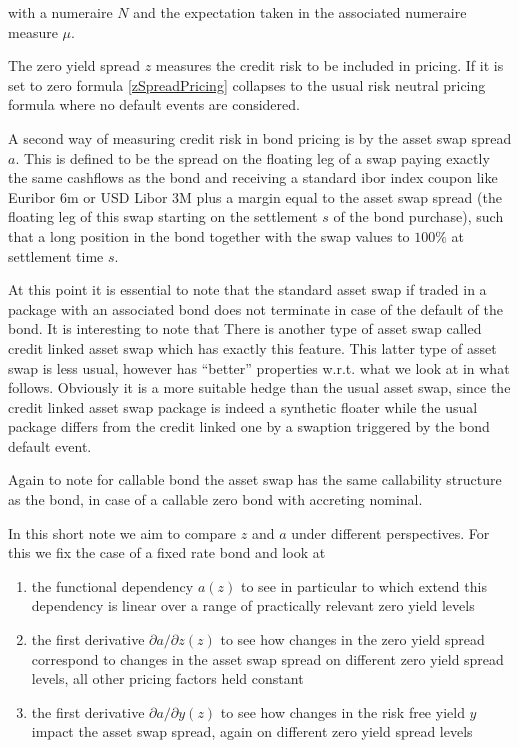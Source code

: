 \documentclass{amsart}
\theoremstyle{plain}
\numberwithin{equation}{section}
\begin{document}
with a numeraire $N$ and the expectation taken in the associated numeraire measure $\mu$. 

The zero yield spread $z$ measures the credit risk to be included in pricing. If it is set to zero formula \ref{zSpreadPricing} collapses to the usual risk neutral pricing formula where no default events are considered.

A second way of measuring credit risk in bond pricing is by the asset swap spread $a$. This is defined to be the spread on the floating leg of a swap paying exactly the same cashflows as the bond and receiving a standard ibor index coupon like Euribor 6m or USD Libor 3M plus a margin equal to the asset swap spread (the floating leg of this swap starting on the settlement $s$ of the bond purchase), such that a long position in the bond together with the swap values to $100\%$ at settlement time $s$.

At this point it is essential to note that the standard asset swap if traded in a package with an associated bond does not terminate in case of the default of the bond. It is interesting to note that There is another type of asset swap called credit linked asset swap which has exactly this feature. This latter type of asset swap is less usual, however has ``better'' properties w.r.t. what we look at in what follows. Obviously it is a more suitable hedge than the usual asset swap, since the credit linked asset swap package is indeed a synthetic floater while the usual package differs from the credit linked one by a swaption triggered by the bond default event.

Again to note for callable bond the asset swap has the same callability structure as the bond, in case of a callable zero bond with accreting nominal.

In this short note we aim to compare $z$ and $a$ under different perspectives. For this we fix the case of a fixed rate bond and look at

\begin{enumerate}
\item the functional dependency $a(z)$ to see in particular to which extend this dependency is linear over a range of practically relevant zero yield levels
\item the first derivative $\partial a / \partial z (z) $ to see how changes in the zero yield spread correspond to changes in the asset swap spread on different zero yield spread levels, all other pricing factors held constant
\item the first derivative $\partial a / \partial y (z) $ to see how changes in the risk free yield $y$ impact the asset swap spread, again on different zero yield spread levels
\end{enumerate}
\end{document}
